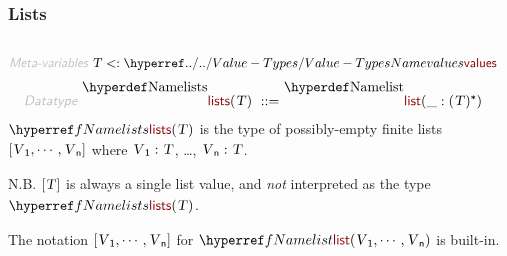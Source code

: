 \subsubsection*{Lists}\hypertarget{lists}{}\label{lists}

\begin{align*}
  [ ~ 
  \KEY{Datatype} ~ & \NAMEREF{lists} \\
  \KEY{Funcon} ~ & \NAMEREF{list} \\
  \KEY{Funcon} ~ & \NAMEREF{list-elements} \\
  \KEY{Funcon} ~ & \NAMEREF{list-nil} \\
  \KEY{Alias} ~ & \NAMEREF{nil} \\
  \KEY{Funcon} ~ & \NAMEREF{list-cons} \\
  \KEY{Alias} ~ & \NAMEREF{cons} \\
  \KEY{Funcon} ~ & \NAMEREF{list-head} \\
  \KEY{Alias} ~ & \NAMEREF{head} \\
  \KEY{Funcon} ~ & \NAMEREF{list-tail} \\
  \KEY{Alias} ~ & \NAMEREF{tail} \\
  \KEY{Funcon} ~ & \NAMEREF{list-length} \\
  \KEY{Funcon} ~ & \NAMEREF{list-append}
  ~ ]
\end{align*}
\begin{align*}
  \KEY{Meta-variables} ~ 
  & \VAR{T} <: \NAMEHYPER{../..}{Value-Types}{values}
\end{align*}
\begin{align*}
  \KEY{Datatype} ~ 
  \NAMEDECL{lists}(\VAR{T} )  
  ~ ::= ~ & \NAMEDECL{list} (\_ : ( \VAR{T} )\STAR)
\end{align*}
$\SHADE{\NAMEREF{lists}
           ( \VAR{T} )}$ is the type of possibly-empty finite lists $\SHADE{[ \VAR{V}\SUB{1},  
           \cdots,  
           \VAR{V}\SUB{n} ]}$ 
  where $\SHADE{\VAR{V}\SUB{1} : \VAR{T}}$, \ldots{}, $\SHADE{\VAR{V}\SUB{n} : \VAR{T}}$.

N.B. $\SHADE{[ \VAR{T} ]}$ is always a single list value, and \emph{not} interpreted as the
  type $\SHADE{\NAMEREF{lists}
           ( \VAR{T} )}$.

The notation $\SHADE{[ \VAR{V}\SUB{1},  
           \cdots,  
           \VAR{V}\SUB{n} ]}$ for $\SHADE{\NAMEREF{list}
           ( \VAR{V}\SUB{1},   
             \cdots,   
             \VAR{V}\SUB{n} )}$ is built-in.

